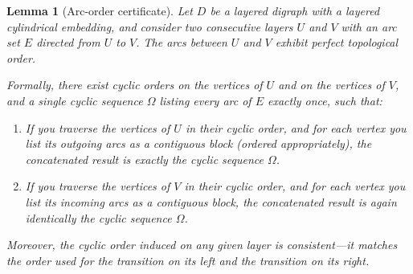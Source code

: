 \documentclass[11pt]{article}
\newtheorem{lemma}[theorem]{Lemma}
\theoremstyle{definition}
\theoremstyle{remark}
\begin{document}
\begin{lemma}[Arc-order certificate]\label{lem:certificate}
Let $D$ be a layered digraph with a layered cylindrical embedding, and consider two consecutive layers $U$ and $V$ with an arc set $E$ directed from $U$ to $V$. The arcs between $U$ and $V$ exhibit perfect topological order.

Formally, there exist cyclic orders on the vertices of $U$ and on the vertices of $V$, and a single cyclic sequence $\Omega$ listing every arc of $E$ exactly once, such that:
\begin{enumerate}
    \item If you traverse the vertices of $U$ in their cyclic order, and for each vertex you list its outgoing arcs as a contiguous block (ordered appropriately), the concatenated result is exactly the cyclic sequence $\Omega$.
    \item If you traverse the vertices of $V$ in their cyclic order, and for each vertex you list its incoming arcs as a contiguous block, the concatenated result is again identically the cyclic sequence $\Omega$.
\end{enumerate}
Moreover, the cyclic order induced on any given layer is consistent---it matches the order used for the transition on its left and the transition on its right.
\end{lemma}
\end{document}
